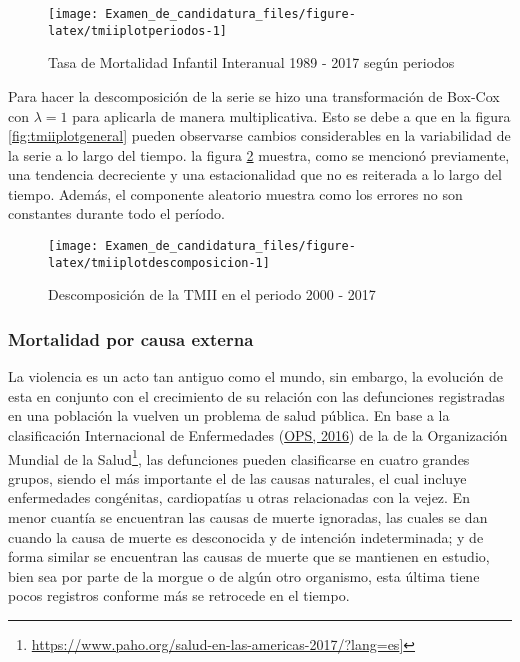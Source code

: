 \documentclass[
]{article}
\begin{document}
\begin{figure}[H]
\texttt{[image: Examen\_de\_candidatura\_files/figure-latex/tmiiplotperiodos-1]} \caption{Tasa de Mortalidad Infantil Interanual 1989 - 2017 según periodos}\label{fig:tmiiplotperiodos}
\end{figure}

Para hacer la descomposición de la serie se hizo una transformación de
Box-Cox con \(\lambda=1\) para aplicarla de manera multiplicativa. Esto
se debe a que en la figura \ref{fig:tmiiplotgeneral} pueden observarse
cambios considerables en la variabilidad de la serie a lo largo del
tiempo. la figura \ref{fig:tmiiplotdescomposicion} muestra, como se
mencionó previamente, una tendencia decreciente y una estacionalidad que
no es reiterada a lo largo del tiempo. Además, el componente aleatorio
muestra como los errores no son constantes durante todo el período.

\begin{figure}[H]
\texttt{[image: Examen\_de\_candidatura\_files/figure-latex/tmiiplotdescomposicion-1]} \caption{Descomposición de la TMII en el periodo 2000 - 2017}\label{fig:tmiiplotdescomposicion}
\end{figure}

\subsubsection{Mortalidad por causa externa}

La violencia es un acto tan antiguo como el mundo, sin embargo, la
evolución de esta en conjunto con el crecimiento de su relación con las
defunciones registradas en una población la vuelven un problema de salud
pública. En base a la clasificación Internacional de Enfermedades
(\protect\hyperlink{ref-CIE10}{OPS, 2016}) de la de la Organización
Mundial de la Salud\footnote{\url{https://www.paho.org/salud-en-las-americas-2017/?lang=es}{]}},
las defunciones pueden clasificarse en cuatro grandes grupos, siendo el
más importante el de las causas naturales, el cual incluye enfermedades
congénitas, cardiopatías u otras relacionadas con la vejez. En menor
cuantía se encuentran las causas de muerte ignoradas, las cuales se dan
cuando la causa de muerte es desconocida y de intención indeterminada; y
de forma similar se encuentran las causas de muerte que se mantienen en
estudio, bien sea por parte de la morgue o de algún otro organismo, esta
última tiene pocos registros conforme más se retrocede en el tiempo.
\end{document}
